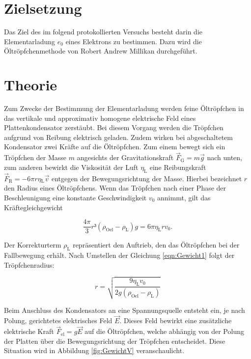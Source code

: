 



\section{Zielsetzung}
\label{sec:Zielsetzung}

Das Ziel des im folgend protokollierten Versuchs besteht darin die Elementarladung $e_0$ eines Elektrons
zu bestimmen. Dazu wird die Öltröpfchenmethode von Robert Andrew Millikan durchgeführt.

\section{Theorie}
\label{sec:Theorie}

Zum Zwecke der Bestimmung der Elementarladung werden feine Öltröpfchen in das vertikale und approximativ 
homogene elektrische Feld eines Plattenkondensator zerstäubt. Bei diesem Vorgang werden die Tröpfchen
aufgrund von Reibung elektrisch geladen. Zudem wirken bei abgeschaltetem Kondensator zwei Kräfte auf die 
Öltröpfchen. Zum einem bewegt sich ein Tröpfchen der Masse $m$ angesichts der Gravitationskraft
$\vec{F}_\text{G} = m\vec{g}$ nach unten, zum anderen bewirkt die Viskosität der Luft $\eta_\text{L}$ eine 
Reibungskraft $\vec{F}_\text{R} = -6\pi{}r\eta{}_\text{L}\vec{v}$ entgegen der Bewegungsrichtung der Masse. 
Hierbei bezeichnet $r$ den Radius eines Öltröpfchens. Wenn das Tröpfchen nach einer Phase der Beschleunigung 
eine konstante Geschwindigkeit $v_0$ annimmt, gilt das Kräftegleichgewicht

\begin{equation}
\label{eqn:Gewicht1}
    \frac{4\pi}{3}r³\left(\rho_\text{Oel}-\rho_\text{L}\right)g = 6\pi{}\eta_\text{L}rv_0.
\end{equation}

\noindent Der Korrekturterm $\rho_\text{L}$ repräsentiert den Auftrieb, den das Öltröpfchen bei der
Fallbewegung erhält. Nach Umstellen der Gleichung \eqref{eqn:Gewicht1} folgt der Tröpfchenradius:

\begin{equation*}
    r = \sqrt{\frac{9\eta_\text{L}v_0}{2g\left(\rho_\text{Oel}-\rho_\text{L}\right)}}
\end{equation*}

\noindent Beim Anschluss des Kondensators an eine Spannungsquelle entsteht ein, je nach Polung, gerichtetes 
elektrisches Feld $\vec{E}$. Dieses Feld bewirkt eine zusätzliche elektrische Kraft $\vec{F}_\text{el} = g\vec{E}$
auf die Öltröpfchen, welche abhängig von der Polung der Platten über die Bewegungsrichtung der Tröpfchen entscheidet.
Diese Situation wird in Abbildung \ref{fig:GewichtV} veranschaulicht.


